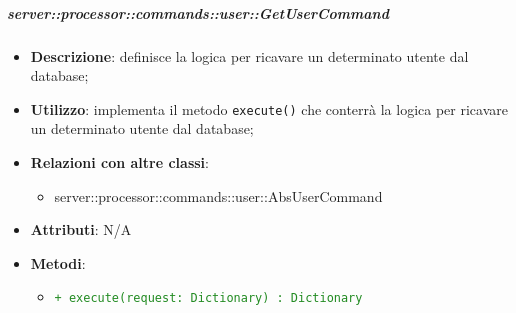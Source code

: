         \subparagraph{server::processor::commands::user::GetUserCommand} %
        \label{subp:bdsm_app_server_processor_commands_user_getusercommand}
        \begin{itemize}
          \item \textbf{Descrizione}: definisce la logica per ricavare un determinato utente dal database;
          \item \textbf{Utilizzo}: implementa il metodo \texttt{execute()} che conterrà la logica per ricavare un determinato utente dal database;
          \item \textbf{Relazioni con altre classi}:
            \begin{itemize}
              \item server::processor::commands::user::AbsUserCommand
            \end{itemize}
          \item \textbf{Attributi}: N/A
          \item \textbf{Metodi}:
          \begin{itemize}
              \item \textcolor{forestgreen}{\texttt{+ execute(request: Dictionary) : Dictionary}}
          \end{itemize}
        \end{itemize}

